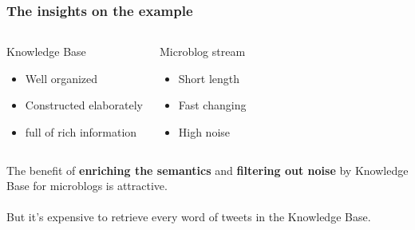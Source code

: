 \documentclass{beamer}
\begin{document}
\begin{frame}
\frametitle{The insights on the example}	
\begin{columns}[onlytextwidth, t]
    \begin{tcolorbox}[colback=red!5,colframe=red!5]
    Knowledge Base
        \begin{itemize}
            \item Well organized
            \item Constructed elaborately
            \item full of rich information
        \end{itemize}
    \end{tcolorbox}

    \begin{tcolorbox}[colback=red!5,colframe=red!5]
    Microblog stream
        \begin{itemize}
            \item Short length
            \item Fast changing
            \item High noise
        \end{itemize}
    \end{tcolorbox}
\end{columns}

\begin{tcolorbox}[colback=red!5,colframe=red!75!black]
The benefit of \textbf{enriching the semantics} and \textbf{filtering out noise} by Knowledge Base for microblogs is attractive.
\\~\\
But it's expensive to retrieve every word of tweets in the Knowledge Base.
\end{tcolorbox}


\end{frame}
\end{document}
